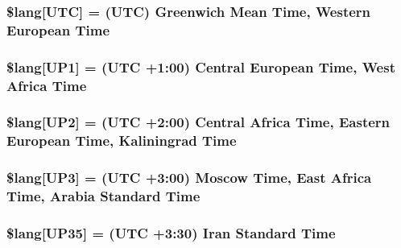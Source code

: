 \subsubsection[{\$lang}]{\setlength{\rightskip}{0pt plus 5cm}\$lang\mbox{[}\textquotesingle{}U\+T\+C\textquotesingle{}\mbox{]} = \textquotesingle{}(U\+T\+C) Greenwich Mean Time, Western European Time\textquotesingle{}}\label{date__lang_8php_ab153b3219e74743184b7dee67e86f9fc}
\hypertarget{date__lang_8php_a788996558e6c8cafd788a1fef6b0be4e}{}
\subsubsection[{\$lang}]{\setlength{\rightskip}{0pt plus 5cm}\$lang\mbox{[}\textquotesingle{}U\+P1\textquotesingle{}\mbox{]} = \textquotesingle{}(U\+T\+C +1\+:00) Central European Time, West Africa Time\textquotesingle{}}\label{date__lang_8php_a788996558e6c8cafd788a1fef6b0be4e}
\hypertarget{date__lang_8php_adfeba045961d07f8f30c0f1a7b8b4ff9}{}
\subsubsection[{\$lang}]{\setlength{\rightskip}{0pt plus 5cm}\$lang\mbox{[}\textquotesingle{}U\+P2\textquotesingle{}\mbox{]} = \textquotesingle{}(U\+T\+C +2\+:00) Central Africa Time, Eastern European Time, Kaliningrad Time\textquotesingle{}}\label{date__lang_8php_adfeba045961d07f8f30c0f1a7b8b4ff9}
\hypertarget{date__lang_8php_a5eddd4b83edcbefcc883077949d40a67}{}
\subsubsection[{\$lang}]{\setlength{\rightskip}{0pt plus 5cm}\$lang\mbox{[}\textquotesingle{}U\+P3\textquotesingle{}\mbox{]} = \textquotesingle{}(U\+T\+C +3\+:00) Moscow Time, East Africa Time, Arabia Standard Time\textquotesingle{}}\label{date__lang_8php_a5eddd4b83edcbefcc883077949d40a67}
\hypertarget{date__lang_8php_ad669ea69fd450762d029592b6ac64395}{}
\subsubsection[{\$lang}]{\setlength{\rightskip}{0pt plus 5cm}\$lang\mbox{[}\textquotesingle{}U\+P35\textquotesingle{}\mbox{]} = \textquotesingle{}(U\+T\+C +3\+:30) Iran Standard Time\textquotesingle{}}\label{date__lang_8php_ad669ea69fd450762d029592b6ac64395}
\hypertarget{date__lang_8php_ad0131a14a1ede9328baf1a1827602f45}{}
